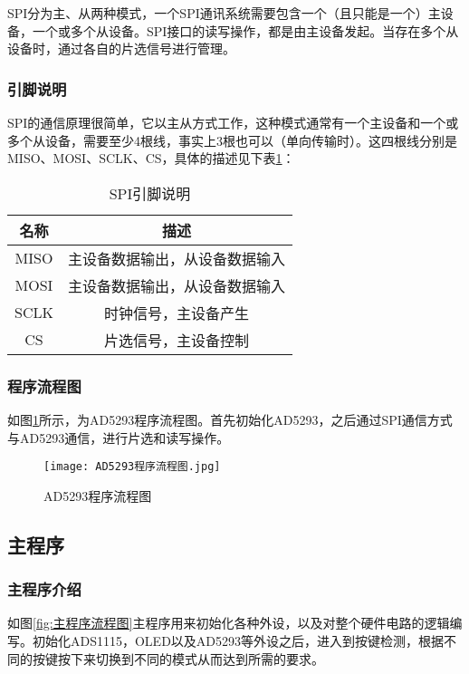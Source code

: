\documentclass[lang=cn,11pt,a4paper]{elegantpaper}
\begin{document}
SPI分为主、从两种模式，一个SPI通讯系统需要包含一个（且只能是一个）主设备，一个或多个从设备。SPI接口的读写操作，都是由主设备发起。当存在多个从设备时，通过各自的片选信号进行管理。

\subsubsection{引脚说明}
SPI的通信原理很简单，它以主从方式工作，这种模式通常有一个主设备和一个或多个从设备，需要至少4根线，事实上3根也可以（单向传输时）。这四根线分别是MISO、MOSI、SCLK、CS，具体的描述见下表\ref{tab:SPI}：
\begin{table}[!ht]
  \centering
  \caption{SPI引脚说明}
  \begin{tabular}{cc}
    \textbf{名称} & \textbf{描述 }    \\ \hline
    MISO        & 主设备数据输出，从设备数据输入 \\
    MOSI        & 主设备数据输出，从设备数据输入 \\
    SCLK        & 时钟信号，主设备产生      \\
    CS          & 片选信号，主设备控制      \\
  \end{tabular}
  \label{tab:SPI}
\end{table}

\subsubsection{程序流程图}
如图\ref{fig:AD5293程序流程图}所示，为AD5293程序流程图。首先初始化AD5293，之后通过SPI通信方式与AD5293通信，进行片选和读写操作。

\begin{figure}[!htb]
  \centering
  \texttt{[image: AD5293程序流程图.jpg]}
  \caption{AD5293程序流程图}
  \label{fig:AD5293程序流程图}
\end{figure}

\subsection{主程序}
\subsubsection{主程序介绍}
如图\ref{fig:主程序流程图}主程序用来初始化各种外设，以及对整个硬件电路的逻辑编写。初始化ADS1115，OLED以及AD5293等外设之后，进入到按键检测，根据不同的按键按下来切换到不同的模式从而达到所需的要求。
\end{document}
